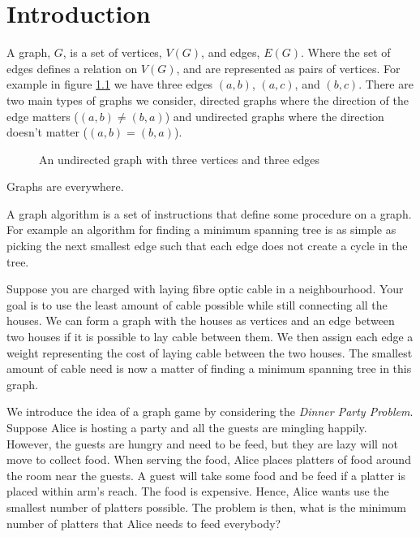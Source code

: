 \chapter{Introduction}\label{chpt:into}
A graph, $G$, is a set of vertices, $V(G)$, and edges, $E(G)$. Where the set of edges defines a relation on $V(G)$, and are represented as pairs of vertices. For example in figure \ref{fig:k3} we have three edges $(a,b)$, $(a,c)$, and $(b,c)$. There are two main types of graphs we consider, directed graphs where the direction of the edge matters ($(a,b)\neq (b,a)$) and undirected graphs where the direction doesn't matter ($(a,b)=(b,a)$).

\begin{figure}[h]
    \centering
{}
    \caption{An undirected graph with three vertices and three edges}
\label{fig:k3}
\end{figure}
   
Graphs are everywhere.  

A graph algorithm is a set of instructions that define some procedure on a graph. 
For example an algorithm for finding a minimum spanning tree is as simple as picking the next smallest edge such that each edge does not create a cycle in the tree.  

Suppose you are charged with laying fibre optic cable in a neighbourhood. Your goal is to use the least amount of cable possible while still connecting all the houses. We can form a graph with the houses as vertices and an edge between two houses if it is possible to lay cable between them. We then assign each edge a weight representing the cost of laying cable between the two houses. The smallest amount of cable need is now a matter of finding a minimum spanning tree in this graph. 
   
We introduce the idea of a graph game by considering the \textit{Dinner Party Problem}.
Suppose Alice is hosting a party and all the guests are mingling happily. However, the guests are hungry and need to be feed, but they are lazy will not move to collect food. When serving the food, Alice places platters of food around the room near the guests. A guest will take some food and be feed if a platter is placed within arm's reach. The food is expensive. Hence, Alice wants use the smallest number of platters possible. The problem is then, what is the minimum number of platters that Alice needs to feed everybody? 

